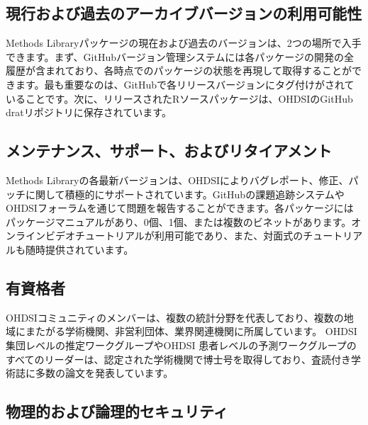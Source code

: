 \documentclass[
  11pt]{book}
\theoremstyle{definition}
\theoremstyle{definition}
\theoremstyle{definition}
\theoremstyle{definition}
\theoremstyle{remark}
\begin{document}
\subsection{現行および過去のアーカイブバージョンの利用可能性}\label{ux73feux884cux304aux3088ux3073ux904eux53bbux306eux30a2ux30fcux30abux30a4ux30d6ux30d0ux30fcux30b8ux30e7ux30f3ux306eux5229ux7528ux53efux80fdux6027}

Methods Libraryパッケージの現在および過去のバージョンは、2つの場所で入手できます。まず、GitHubバージョン管理システムには各パッケージの開発の全履歴が含まれており、各時点でのパッケージの状態を再現して取得することができます。最も重要なのは、GitHubで各リリースバージョンにタグ付けがされていることです。次に、リリースされたRソースパッケージは、OHDSIのGitHub dratリポジトリに保存されています。

\subsection{メンテナンス、サポート、およびリタイアメント}\label{ux30e1ux30f3ux30c6ux30caux30f3ux30b9ux30b5ux30ddux30fcux30c8ux304aux3088ux3073ux30eaux30bfux30a4ux30a2ux30e1ux30f3ux30c8}

Methods Libraryの各最新バージョンは、OHDSIによりバグレポート、修正、パッチに関して積極的にサポートされています。GitHubの課題追跡システムやOHDSIフォーラムを通じて問題を報告することができます。各パッケージにはパッケージマニュアルがあり、0個、1個、または複数のビネットがあります。オンラインビデオチュートリアルが利用可能であり、また、対面式のチュートリアルも随時提供されています。

\subsection{有資格者}\label{ux6709ux8cc7ux683cux8005}

OHDSIコミュニティのメンバーは、複数の統計分野を代表しており、複数の地域にまたがる学術機関、非営利団体、業界関連機関に所属しています。 OHDSI集団レベルの推定ワークグループやOHDSI 患者レベルの予測ワークグループのすべてのリーダーは、認定された学術機関で博士号を取得しており、査読付き学術誌に多数の論文を発表しています。

\subsection{物理的および論理的セキュリティ}\label{ux7269ux7406ux7684ux304aux3088ux3073ux8ad6ux7406ux7684ux30bbux30adux30e5ux30eaux30c6ux30a3}
\end{document}
